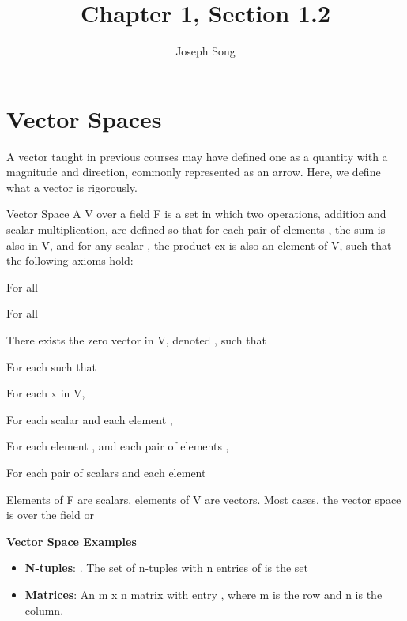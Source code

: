 \documentclass{article}
\title{Chapter 1, Section 1.2}
\author{Joseph Song}
\date{}
\begin{document}
\maketitle

\section{Vector Spaces}

A vector taught in previous courses may have defined one as a quantity with a magnitude and direction, commonly represented as an arrow. Here, we define what a vector is rigorously.

\begin{definition}{Vector Space}
A  V over a field F is a set in which two operations, addition and scalar multiplication, are defined so that for each pair of elements , the sum  is also in V, and for any scalar , the product cx is also an element of V, such that the following axioms hold:
\end{definition}

\begin{axioms}
    \item For all 
    \item For all 
    \item There exists the zero vector in V, denoted , such that 
    \item For each  such that 
    \item For each x in V, 
    \item For each scalar  and each element , 
    \item For each element , and each pair of elements , 
    \item For each pair of scalars  and each element 
\end{axioms}


\mm{\star} Elements of F are scalars, elements of V are vectors. Most cases, the vector space is over the field  or \newline

\textbf{Vector Space Examples}
\begin{itemize}
    \item \textbf{N-tuples}: . The set of n-tuples with n entries of  is the set 
    \item \textbf{Matrices}: An m x n matrix with entry , where m is the row and n is the column.
\end{itemize}
\end{document}

